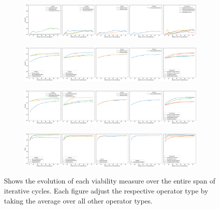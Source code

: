 
\begin{figure}[htbp]
    \centering
    \begin{subfigure}[c]{0.9\textwidth}
        \centering
        \includegraphics[width=\textwidth]{figures/generated/exp1_feasibility.png}
        \label{fig:exp1-feasibility}    
    \end{subfigure}
    \hfill
    \begin{subfigure}[c]{0.9\textwidth}
        \centering
        \includegraphics[width=\textwidth]{figures/generated/exp1_similarity.png}
        \label{fig:exp1-similarity}
    \end{subfigure}
    \hfill
    \begin{subfigure}[c]{0.9\textwidth}
        \centering
        \includegraphics[width=\textwidth]{figures/generated/exp1_sparcity.png}
        \label{fig:exp1-sparcity}
    \end{subfigure}
    \hfill
    \begin{subfigure}[c]{0.9\textwidth}
        \centering
        \includegraphics[width=\textwidth]{figures/generated/exp1_delta.png}
        \label{fig:exp1-delta}
    \end{subfigure}
    \caption{Shows the evolution of each viability measure over the entire span of iterative cycles. Each figure adjust the respective operator type by taking the average over all other operator types. }
    \label{fig:exp1-measure}
\end{figure}